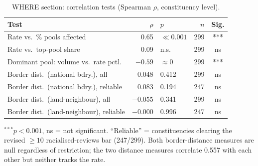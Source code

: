 
\begin{table}[htbp]
\centering
\footnotesize
\setlength{\tabcolsep}{4pt}
\caption{WHERE section: correlation tests (Spearman $\rho$, constituency level).}
\label{tab:where-correlations}
\begin{tabular}{@{} l r l r c @{}}
\toprule
Test & $\rho$ & $p$ & $n$ & Sig. \\
\midrule
Rate vs.\ \% pools affected & 0.65 & $\ll 0.001$ & 299 & *** \\
Rate vs.\ top-pool share & 0.09 & n.s. & 299 & ns \\
Dominant pool: volume vs.\ rate pctl.\ & $-0.59$ & $\approx 0$ & 299 & *** \\
Border dist.\ (national bdry.), all & 0.048 & 0.412 & 299 & ns \\
Border dist.\ (national bdry.), reliable & 0.083 & 0.194 & 247 & ns \\
Border dist.\ (land-neighbour), all & $-0.055$ & 0.341 & 299 & ns \\
Border dist.\ (land-neighbour), reliable & $-0.000$ & 0.996 & 247 & ns \\
\bottomrule
\end{tabular}

\vspace{2pt}
\raggedright\footnotesize
$^{***}p<0.001$, ns = not significant. ``Reliable'' = constituencies clearing the revised $\geq 10$ racialised-reviews bar (247/299). Both border-distance measures are null regardless of restriction; the two distance measures correlate 0.557 with each other but neither tracks the rate.
\end{table}

